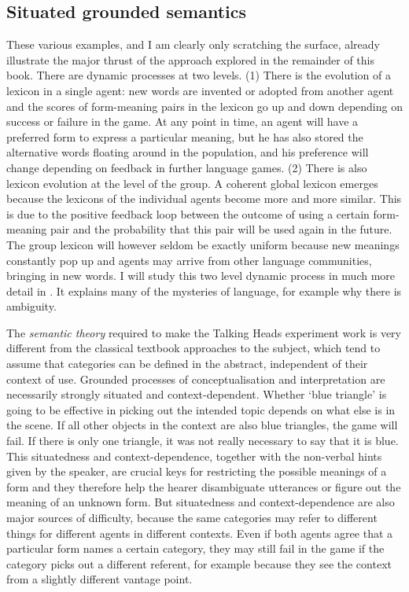 \subsection{Situated grounded semantics}

These various examples, and I am clearly only 
scratching the surface, already illustrate the major thrust of the 
approach explored in the remainder of this book. 
There are dynamic processes at two levels. (1) There is 
the evolution of a lexicon in a single agent: new words are
invented or adopted from another agent and the
scores of form-meaning pairs in the lexicon
go up and down depending on success or
failure in the game. At any point in time, an agent 
will have a preferred form to express a particular meaning, 
but he has also stored the alternative words floating around in the 
population, and his preference will change depending on feedback
in further language games. (2) There is also lexicon evolution at 
the level of the group. A coherent global lexicon emerges because
the lexicons of the individual agents become more and more 
similar. This is due to the positive feedback loop between
the outcome of using
a certain form-meaning pair and the probability that
this pair will be used again in the future. 
The group lexicon will however seldom be exactly uniform because
new meanings constantly pop up and agents may arrive from 
other language communities, bringing in new words. 
I will study this two level dynamic process in much more detail 
in . It explains many of the mysteries of
language, for example why there is ambiguity. 

The {\itshape semantic theory} required to make the 
Talking Heads experiment work is very different from 
the classical textbook approaches to the subject, which
tend to assume that categories can be defined in the 
abstract, independent of their context of use. Grounded
processes of conceptualisation and interpretation are necessarily
strongly situated and context-dependent. Whether `blue 
triangle' is going to be effective in picking out the 
intended topic depends on what else is in
the scene. If all other objects in the 
context are also blue triangles, the game will fail. If there
is only one triangle, it was not really necessary to say that 
it is blue. This situatedness and context-dependence, together with 
the non-verbal hints given by the speaker, are crucial 
keys for restricting the 
possible meanings of a form 
and they therefore help the hearer disambiguate 
utterances or figure out the meaning of an unknown form. But situatedness 
and con\-text-dependence are also major
sources of difficulty, because the same categories may
refer to different things for different agents in different
contexts. Even if both agents agree that a particular form 
names a certain category, 
they may still fail in the game if the category picks
out a different referent, for example because they see 
the context from a slightly different vantage point. 

